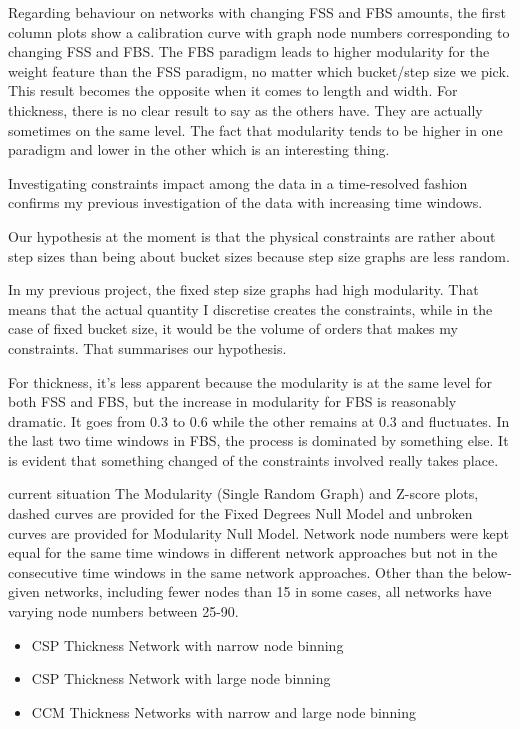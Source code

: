 



{\color{red}
	Regarding behaviour on networks with changing FSS and FBS amounts, the first column plots show a calibration curve with graph node numbers corresponding to changing FSS and FBS. The FBS paradigm leads to higher modularity for the weight feature than the FSS paradigm, no matter which bucket/step size we pick. This result becomes the opposite when it comes to length and width. For thickness, there is no clear result to say as the others have. They are actually sometimes on the same level. The fact that modularity tends to be higher in one paradigm and lower in the other which is an interesting thing.
	
	Investigating constraints impact among the data in a time-resolved fashion confirms my previous investigation of the data with increasing time windows.
	
	Our hypothesis at the moment is that the physical constraints are rather about step sizes than being about bucket sizes because step size graphs are less random.
	
	In my previous project, the fixed step size graphs had high modularity. That means that the actual quantity I discretise creates the constraints, while in the case of fixed bucket size, it would be the volume of orders that makes my constraints. That summarises our hypothesis. 
	
	
	For thickness, it's less apparent because the modularity is at the same level for both FSS and FBS, but the increase in modularity for FBS is reasonably dramatic. It goes from 0.3 to 0.6 while the other remains at 0.3 and fluctuates. In the last two time windows in FBS, the process is dominated by something else. It is evident that something changed of the constraints involved really takes place.
	
	current situation
	The Modularity (Single Random Graph) and Z-score plots, dashed curves are provided for the Fixed Degrees Null Model and unbroken curves are provided for Modularity Null Model.
	Network node numbers were kept equal for the same time windows in different network approaches but not in the consecutive time windows in the same network approaches.
	Other than the below-given networks, including fewer nodes than 15 in some cases, all networks have varying node numbers between 25-90.
	\begin{itemize}
		\item CSP Thickness Network with narrow node binning
		\item CSP Thickness Network with large node binning
		\item CCM Thickness Networks with narrow and large node binning
	\end{itemize}
	
}
